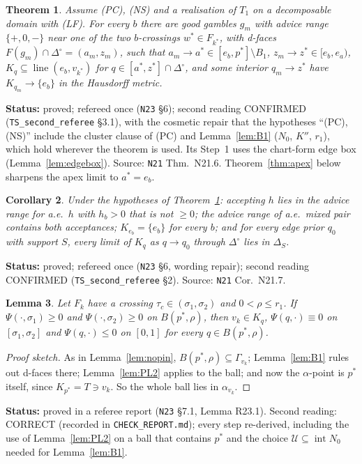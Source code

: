 \documentclass[11pt]{article}
\newtheorem{theorem}{Theorem}[section]
\newtheorem{lemma}[theorem]{Lemma}
\newtheorem{corollary}[theorem]{Corollary}
\theoremstyle{definition}
\theoremstyle{remark}
\newcommand{\Di}{\Delta^{\circ}}
\newcommand{\lin}{\operatorname{line}}
\newcommand{\src}[1]{\texttt{#1}}
\newcommand{\status}[1]{\par\smallskip\noindent\textbf{Status:} #1\par\smallskip}
\begin{document}
\begin{theorem}\label{thm:cuts}
Assume (PC), (NS) and a realisation of $T_1$ on a decomposable domain with (LF). For every $b$ there are good gambles $g_m$ with advice range $\{+,0,-\}$ near one of the two $b$-crossings $w^*\in F_{k^*}$, with d-faces $F(g_m)\cap\Di=(a_m,z_m)$, such that $a_m\to a^*\in[e_b,p^*]\setminus B_1$, $z_m\to z^*\in[e_b,e_a)$, $K_q\subseteq\lin(e_b,v_{k^*})$ for $q\in[a^*,z^*]\cap\Di$, and some interior $q_m\to z^*$ have $K_{q_m}\to\{e_b\}$ in the Hausdorff metric.
\end{theorem}
\status{proved; refereed once (\src{N23} \S6); second reading CONFIRMED (\src{TS\_second\_referee} \S3.1), with the cosmetic repair that the hypotheses ``(PC), (NS)'' include the cluster clause of (PC) and Lemma~\ref{lem:B1} ($N_0$, $K''$, $r_1$), which hold wherever the theorem is used. Its Step~1 uses the chart-form edge box (Lemma~\ref{lem:edgebox}). Source: \src{N21} Thm.~N21.6. Theorem~\ref{thm:apex} below sharpens the apex limit to $a^*=e_b$.}

\begin{corollary}\label{cor:availability}
Under the hypotheses of Theorem~\ref{thm:cuts}: accepting $h$ lies in the advice range for a.e.\ $h$ with $h_b>0$ that is not $\ge0$; the advice range of a.e.\ mixed pair contains both acceptances; $K_{e_b}=\{e_b\}$ for every $b$; and for every edge prior $q_0$ with support $S$, every limit of $K_q$ as $q\to q_0$ through $\Di$ lies in $\Delta_S$.
\end{corollary}
\status{proved; refereed once (\src{N23} \S6, wording repair); second reading CONFIRMED (\src{TS\_second\_referee} \S2). Source: \src{N21} Cor.~N21.7.}

\begin{lemma}\label{lem:R231}
Let $F_k$ have a crossing $\tau_c\in(\sigma_1,\sigma_2)$ and $0<\rho\le r_1$. If $\Psi(\cdot,\sigma_1)\ge0$ and $\Psi(\cdot,\sigma_2)\ge0$ on $B(p^*,\rho)$, then $v_k\in K_q$, $\Psi(q,\cdot)\equiv0$ on $[\sigma_1,\sigma_2]$ and $\Psi(q,\cdot)\le0$ on $[0,1]$ for every $q\in B(p^*,\rho)$.
\end{lemma}
\begin{proof}[Proof sketch]
As in Lemma~\ref{lem:nopin}, $B(p^*,\rho)\subseteq\Gamma_{v_k}$; Lemma~\ref{lem:B1} rules out d-faces there; Lemma~\ref{lem:PL2} applies to the ball; and now the $\alpha$-point is $p^*$ itself, since $K_{p^*}=T\ni v_k$. So the whole ball lies in $\alpha_{v_k}$.
\end{proof}
\status{proved in a referee report (\src{N23} \S7.1, Lemma R23.1). Second reading: CORRECT (recorded in \src{CHECK\_REPORT.md}); every step re-derived, including the use of Lemma~\ref{lem:PL2} on a ball that contains $p^*$ and the choice $\mathcal U\subseteq\operatorname{int}N_0$ needed for Lemma~\ref{lem:B1}.}
\end{document}
